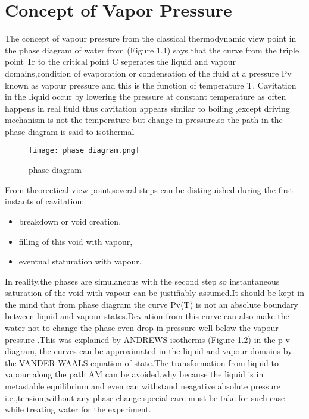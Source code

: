 \section{Concept of Vapor Pressure} 
 The concept of vapour pressure from the classical thermodynamic view point in the phase diagram  of water from (Figure 1.1) says that the curve from the triple point Tr to the critical point C seperates the liquid 
 and vapour domains,condition of evaporation or condensation of the fluid at a pressure Pv known as vapour pressure and this is the function of temperature T.
 Cavitation in  the liquid occur by lowering the pressure at constant temperature as often happens in real fluid thus cavitation appears similar to boiling ,except driving mechanism is not the temperature but 
 change in pressure.so the path in the phase diagram is said to isothermal\\
 \begin{figure}[H]
    \centering
    \texttt{[image: phase diagram.png]}
    \caption{phase diagram}
    \label{fig:fig1}
\end{figure}

 
 From theorectical view point,several steps can be distinguished during the first instants of cavitation:
  \begin{itemize}
  \item breakdown or void creation,
  \item filling of this void with vapour,
  \item eventual staturation with vapour.
  \end {itemize}
  In reality,the phases are simulaneous with the second step so instantaneous saturation of the void with vapour can be justifiably assumed.It should be kept in the mind that from phase diagram the curve Pv(T)
  is not an absolute boundary between liquid and vapour states.Deviation from this curve can also make the water not to change the phase even drop in pressure well below the vapour pressure .This was explained by ANDREWS-isotherms (Figure 1.2) in the p-v diagram,
the curves can be approximated in the liquid and vapour domains by the VANDER WAALS equation of state.The transformation from liquid to vapour along the path AM can be avoided,why because the liquid is in
metastable equilibrium and even can withstand neagative absolute pressure i.e.,tension,without any phase change special care must be take for such case while treating water for the experiment.\\
  
